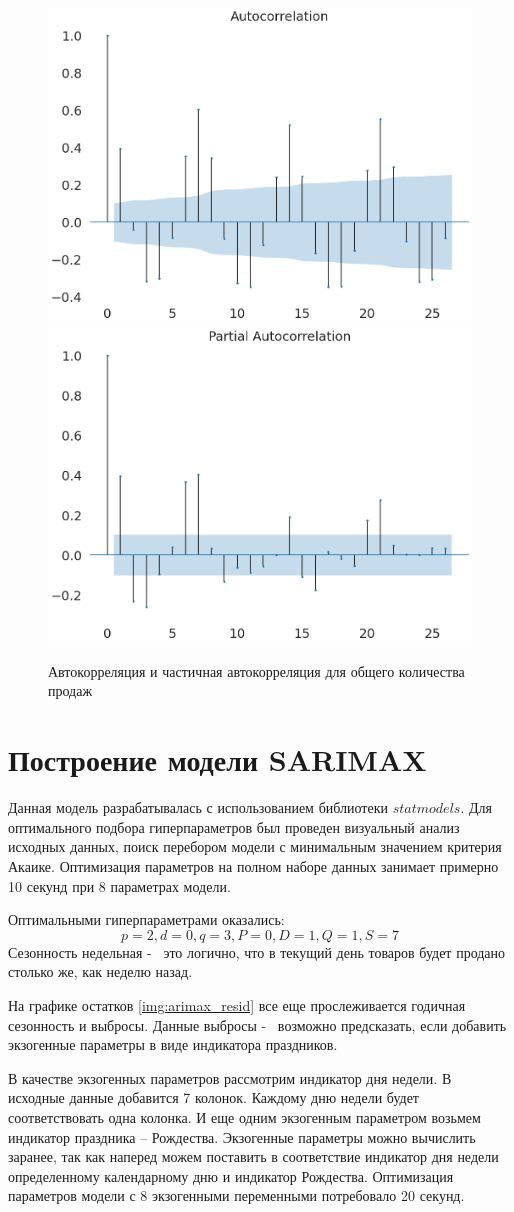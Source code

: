 \def\figurename{Рис}
\begin{figure}[t]
	\centering
	\includegraphics[width=0.4\columnwidth]{./img/sales_autocorrelation.png}
	\includegraphics[width=0.4\columnwidth]{./img/sales_partial_autocorrelation.png}
	\caption{Автокорреляция и частичная автокорреляция для общего количества продаж}
	\label{img:any_autocorrelation}
\end{figure}



\section{Построение модели SARIMAX}

Данная модель разрабатывалась с использованием библиотеки $ statmodels $.
Для оптимального подбора гиперпараметров был проведен
визуальный анализ исходных данных, поиск перебором модели
с минимальным значением критерия Акаике.
Оптимизация параметров на полном наборе данных занимает примерно 10 секунд при 8 параметрах модели.

Оптимальными гиперпараметрами оказались:
\begin{equation}
	p = 2, d = 0, q = 3, P = 0, D = 1, Q = 1, S = 7
\end{equation}
\noindent Сезонность недельная  -~ это логично, что в текущий день
товаров будет продано столько же, как неделю назад.


На графике остатков \ref{img:arimax_resid} все еще прослеживается
годичная сезонность и выбросы. Данные выбросы -~ возможно предсказать, если
добавить экзогенные параметры в виде индикатора праздников.

В качестве экзогенных параметров рассмотрим индикатор дня недели.
В исходные данные добавится 7 колонок. Каждому дню недели
будет соответствовать одна колонка. И еще одним экзогенным параметром
возьмем индикатор праздника -- Рождества.
Экзогенные параметры можно вычислить заранее, так как наперед можем
поставить в соответствие индикатор дня недели определенному календарному дню
и индикатор Рождества.
Оптимизация параметров модели с 8 экзогенными переменными потребовало 20 секунд.

